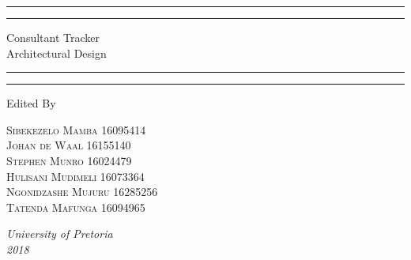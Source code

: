 \documentclass[a4paper, 12pt, oneside]{article}
\begin{document}
\begin{titlepage} %

	\centering %
	
	\scshape %
	
	\vspace*{\baselineskip} %
	
	
	\rule{\textwidth}{1.6pt}\vspace*{-\baselineskip}\vspace*{2pt} %
	\rule{\textwidth}{0.4pt} %
	
	\vspace{0.75\baselineskip} %
	
	{\LARGE Consultant Tracker\\Architectural Design} %
	
	\vspace{0.75\baselineskip} %
	
	\rule{\textwidth}{0.4pt}\vspace*{-\baselineskip}\vspace{3.2pt} %
	\rule{\textwidth}{1.6pt} %
	
	\vspace{2\baselineskip} %
	
	
	
	Edited By
	
	\vspace{0.5\baselineskip} %
	
	{\scshape\Large Sibekezelo Mamba 16095414 \\ Johan de Waal 16155140 \\ Stephen Munro 16024479\\ Hulisani Mudimeli 			16073364 \\ Ngonidzashe Mujuru 16285256  \\ Tatenda Mafunga 16094965\\} %
	
	\vspace{0.5\baselineskip} %
	
	\textit{University of Pretoria \\2018} %
	
	\vfill %
	
\end{titlepage}
\end{document}
